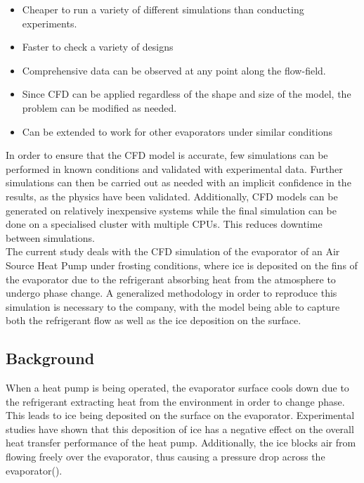 \documentclass[11pt,a4paper,twoside,oneside]{article}
\begin{document}
\begin{itemize}
    \item Cheaper to run a variety of different simulations than conducting experiments.
    \item Faster to check a variety of designs
    \item Comprehensive data can be observed at any point along the flow-field.
    \item Since CFD can be applied regardless of the shape and size of the model, the problem can be modified as needed.
    \item Can be extended to work for other evaporators under similar conditions
\end{itemize}
In order to ensure that the CFD model is accurate, few simulations can be performed in known conditions and validated with experimental data. Further simulations can then be carried out as needed with an implicit confidence in the results, as the physics have been validated. Additionally, CFD models can be generated on relatively inexpensive systems while the final simulation can be done on a specialised cluster with multiple CPUs. This reduces downtime between simulations.\\
The current study deals with the CFD simulation of the evaporator of an Air Source Heat Pump under frosting conditions, where ice is deposited on the fins of the evaporator due to the refrigerant absorbing heat from the atmosphere to undergo phase change. A generalized methodology in order to reproduce this simulation is necessary to the company, with the model being able to capture both the refrigerant flow as well as the ice deposition on the surface.\\

\subsection{Background}\label{sec:bg}
\vspace{.3cm}
When a heat pump is being operated, the evaporator surface cools down due to the refrigerant extracting heat from the environment in order to change phase. This leads to ice being deposited on the surface on the evaporator. Experimental studies have shown that this deposition of ice has a negative effect on the overall heat transfer performance of the heat pump. Additionally, the ice blocks air from flowing freely over the evaporator, thus causing a pressure drop across the evaporator(\cite{martinez1999}\cite{hermes}).
\end{document}

